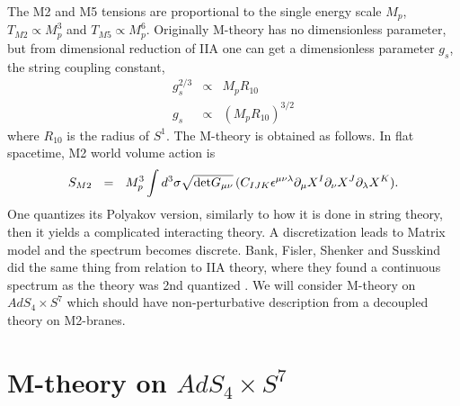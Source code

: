\documentclass[12pt]{article}
\def\be{\begin{eqnarray}}\def\ba{\begin{eqnarray}}
\def\ee{\end{eqnarray}}\def\ea{\end{eqnarray}}
\begin{document}
The M2 and M5 tensions are proportional to the single energy scale $M_p$, $T_{M2} \propto M_p^3$ and $T_{M5} \propto M_p^6$.  
Originally M-theory has no dimensionless parameter, but from dimensional reduction of IIA one can get a dimensionless parameter $g_s$, the string coupling constant,
\ba
g_s^{2/3} & \propto & M_p R_{10} \\
g_s & \propto & (M_p R_{10})^{3/2}
\ea
where $R_{10}$ is the radius of $S^1$.
The M-theory is obtained as follows. 
In flat spacetime, M2 world volume action is
\be \label{Maction}
S_{M2} ~~=~~ M_p^3 \int d^3 \sigma \sqrt{{\rm det}G_{\mu\nu}}\, (C_{IJK}\epsilon^{\mu\nu\lambda}\partial_\mu X^I \partial_\nu X^J \partial_\lambda X^K).
\ee
One quantizes its Polyakov version, similarly to how it is done in string theory, then it yields a complicated interacting theory. 
A discretization leads to Matrix model and the spectrum becomes discrete. 
Bank, Fisler, Shenker and Susskind did the same thing from relation to IIA theory, where they found a continuous spectrum as the theory was 2nd quantized \cite{BFSS,Tayl}. 
We will consider M-theory on $AdS_4 \times S^7$ which should have non-perturbative description from a decoupled theory on M2-branes.

\section{M-theory on $AdS_4 \times S^7$}
\end{document}
